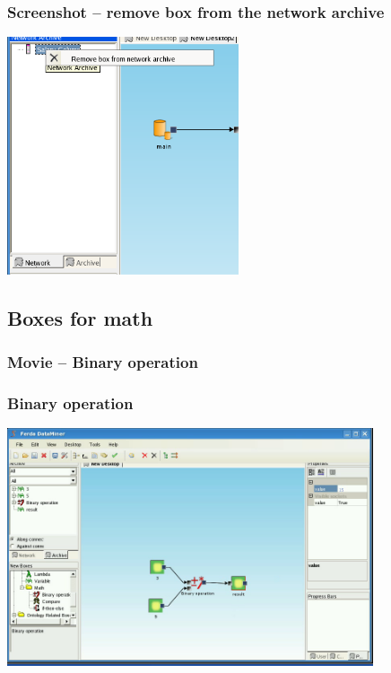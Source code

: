 \documentclass{beamer}
\begin{document}
\begin{frame}
	\frametitle{Screenshot -- remove box from the network archive}
	\includegraphics[height=7cm]{network_archive_remove_box}
\end{frame}

\subsection{Boxes for math}
\begin{frame}
	\frametitle{Movie -- Binary operation}
\end{frame}

\begin{frame}
	\frametitle{Binary operation}
	\includegraphics[width=10.8cm]{binaryOperation2.png}
\end{frame}
\end{document}
